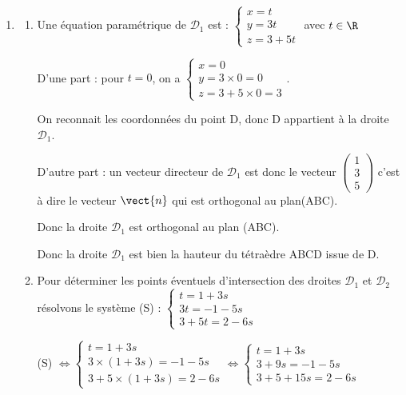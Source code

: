 \begin{enumerate}
\begin{enumerate}
Une équation cartésienne du plan (ABC) est donc	$x+3 y+5 z-8=0$.

		\item  $x_D+3 y_D+5 z_D-8=0+3\times 0 +5\times 3 -8=15-8=7\neq 0 $

Donc le point D n'appartient pas au plan (ABC) d'où  les points A, B, C et D ne sont pas coplanaires.
		\end{enumerate}

	\item

		\begin{enumerate}
			\item  Une équation paramétrique de $\mathcal{D}_{1}$ est :  $\begin{cases} x=t \\ y=3 t \\ z=3+5 t  \end{cases} $ avec $t \in \R$

D'une part : pour $t=0$, on a $\begin{cases} x=0 \\ y=3 \times0 =0  \\ z=3+5 \times 0 =3  \end{cases} $.

			On reconnait les coordonnées du point D, donc D appartient à la droite $\mathcal{D}_{1}$.

D'autre part : un vecteur directeur de $\mathcal{D}_{1}$ est donc le vecteur $\begin{pmatrix}	1\\ 3 \\ 5 \end{pmatrix}$ c'est à dire le vecteur $\vect{n}$ qui est orthogonal au plan(ABC).

Donc la droite $\mathcal{D}_{1}$ est orthogonal au plan (ABC).


Donc  la droite $\mathcal{D}_{1}$ est bien la hauteur du tétraèdre ABCD issue de D.

		\item  Pour déterminer les points éventuels d'intersection des droites $\mathcal{D}_{1}$ et $\mathcal{D}_{2}$  résolvons le système (S) :  $\begin{cases} t=1+3s \\ 3 t=-1-5s \\ 3+5 t=2-6s  \end{cases} $

(S) $\Longleftrightarrow \begin{cases} t =1+3s \\ 3  \times (1+3s)=-1-5s \\ 3+5 \times ( 1+3s)=2-6s  \end{cases}  \Longleftrightarrow  \begin{cases} t =1+3s \\ 3+9s=-1-5s \\ 3+5+15s=2-6s  \end{cases}$


\end{enumerate}
\end{enumerate}
